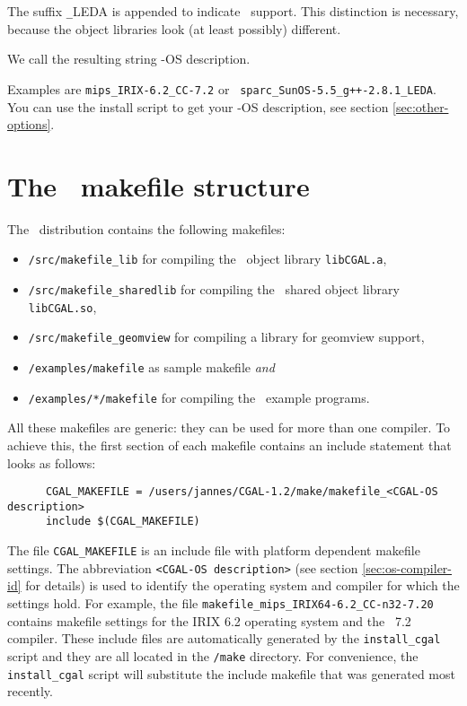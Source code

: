 The suffix \texttt{\_}LEDA is appended to indicate \leda\ support. This
distinction is necessary, because the object libraries look (at least
possibly) different.

We call the resulting string \cgal-OS description. 

Examples are \texttt{mips\_IRIX-6.2\_CC-7.2} or {\tt
  sparc\_SunOS-5.5\_g++-2.8.1\_LEDA}. You can use the install
script to get your \cgal-OS description, see section
\ref{sec:other-options}.

\section{The \cgal\ makefile structure}\label{sec:makefiles}

The \cgal\ distribution contains the following makefiles:
\begin{itemize}
\item \texttt{\cgaldir/src/makefile\_lib} for compiling the \cgal\ 
  object library \texttt{libCGAL.a},
  
\item \texttt{\cgaldir/src/makefile\_sharedlib} for compiling the
  \cgal\ shared object library \texttt{libCGAL.so},
  
\item \texttt{\cgaldir/src/makefile\_geomview} for compiling a library
  for geomview support,
  
\item \texttt{\cgaldir/examples/makefile} as sample makefile
  \textit{and}
  
\item \texttt{\cgaldir/examples/*/makefile} for compiling the \cgal\ 
  example programs.
\end{itemize}

All these makefiles are generic: they can be used for more than one
compiler.  To achieve this, the first section of each makefile
contains an include statement that looks as follows:

\begin{verbatim}
      CGAL_MAKEFILE = /users/jannes/CGAL-1.2/make/makefile_<CGAL-OS description>
      include $(CGAL_MAKEFILE)
\end{verbatim}

The file \texttt{CGAL\_MAKEFILE} is an include file with platform
dependent makefile settings. The abbreviation \texttt{<CGAL-OS
  description>} (see section \ref{sec:os-compiler-id} for details) is
used to identify the operating system and compiler for which the
settings hold. For example, the file
\texttt{makefile\_mips\_IRIX64-6.2\_CC-n32-7.20} contains makefile
settings for the IRIX 6.2 operating system and the \mipsprocc\ 7.2
compiler.  These include files are automatically generated by the
\texttt{install\_cgal} script and they are all located in the
\texttt{\cgaldir/make} directory.  For convenience, the
\texttt{install\_cgal} script will substitute the include makefile
that was generated most recently.

